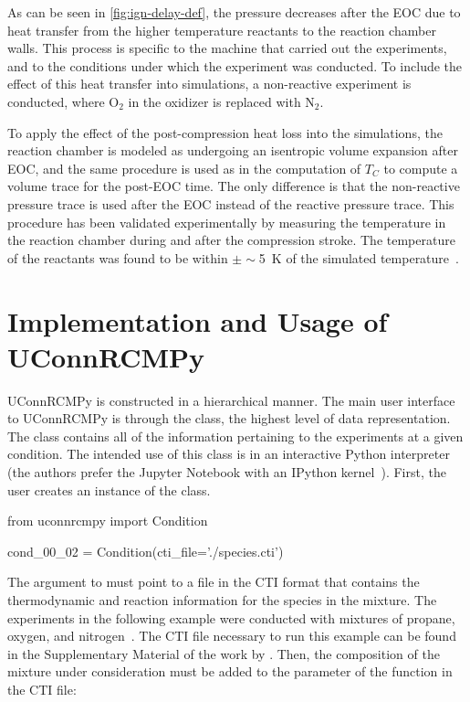 \documentclass[12pt]{ussci}
\begin{document}
As can be seen in \cref{fig:ign-delay-def}, the pressure
decreases after the EOC due to heat transfer from the higher temperature
reactants to the reaction chamber walls. This process is specific to the
machine that carried out the experiments, and to the conditions under
which the experiment was conducted. To include the effect of this heat
transfer into simulations, a non-reactive experiment is conducted, where
\(\text{O}_2\) in the oxidizer is replaced with \(\text{N}_2\).

To apply the effect of the post-compression heat loss into the simulations, the
reaction chamber is modeled as undergoing an isentropic volume expansion after
EOC, and the same procedure is used as in the computation of \(T_C\) to compute
a volume trace for the post-EOC time. The only difference is that the
non-reactive pressure trace is used after the EOC instead of the reactive
pressure trace. This procedure has been validated experimentally by measuring
the temperature in the reaction chamber during and after the compression stroke.
The temperature of the reactants was found to be within $\pm\sim $\SI{5}{\K} of
the simulated temperature~\autocite{Das2012a,Uddi2012}.

\section{Implementation and Usage of UConnRCMPy}\label{implementation-and-usage-of-uconnrcmpy}

UConnRCMPy is constructed in a hierarchical manner. The main user interface to
UConnRCMPy is through the  class, the highest level of data
representation. The  class contains all of the information
pertaining to the experiments at a given condition. The intended use of this
class is in an interactive Python interpreter (the authors prefer the Jupyter
Notebook with an IPython kernel~\autocite{Perez2007}). First, the user creates
an instance of the  class.

\begin{pythonbox}
from uconnrcmpy import Condition

cond_00_02 = Condition(cti_file='./species.cti')
\end{pythonbox}

The  argument to  must point to a file in the
CTI format that contains the thermodynamic and reaction information for the
species in the mixture. The experiments in the following example were conducted
with mixtures of propane, oxygen, and nitrogen~\autocite{Dames2016}. The CTI
file necessary to run this example can be found in the Supplementary Material of
the work by \textcite{Dames2016}. Then, the composition of the mixture under
consideration must be added to the  parameter of the
 function in the CTI file:
\end{document}
